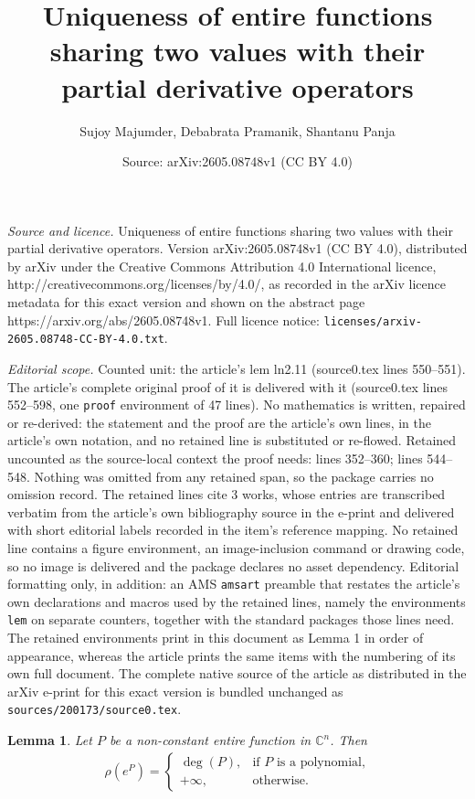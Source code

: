 \documentclass[10pt,a4paper]{amsart}
\title{\LARGE U\Large\MakeLowercase {niqueness of entire functions sharing two values with their partial derivative operators}}
\author{Sujoy Majumder, Debabrata Pramanik, Shantanu Panja}
\date{Source: arXiv:2605.08748v1 (CC BY 4.0)}
\newtheorem{lem}{Lemma}
\begin{document}
\maketitle

\noindent\emph{Source and licence.} \LARGE U\Large\MakeLowercase {niqueness of entire functions sharing two values with their partial derivative operators}. Version arXiv:2605.08748v1 (CC BY 4.0), distributed by arXiv under the Creative Commons Attribution 4.0 International licence, http://creativecommons.org/licenses/by/4.0/, as recorded in the arXiv licence metadata for this exact version and shown on the abstract page https://arxiv.org/abs/2605.08748v1. Full licence notice: \texttt{licenses/arxiv-2605.08748-CC-BY-4.0.txt}.\par\smallskip

\noindent\textit{Editorial scope.} Counted unit: the article's lem ln2.11 (source0.tex lines 550--551). The article's complete original proof of it is delivered with it (source0.tex lines 552--598, one \texttt{proof} environment of 47 lines). No mathematics is written, repaired or re-derived: the statement and the proof are the article's own lines, in the article's own notation, and no retained line is substituted or re-flowed.  Retained uncounted as the source-local context the proof needs: lines 352--360; lines 544--548.  Nothing was omitted from any retained span, so the package carries no omission record.  The retained lines cite 3 works, whose entries are transcribed verbatim from the article's own bibliography source in the e-print and delivered with short editorial labels recorded in the item's reference mapping.  No retained line contains a figure environment, an image-inclusion command or drawing code, so no image is delivered and the package declares no asset dependency.  Editorial formatting only, in addition: an AMS \texttt{amsart} preamble that restates the article's own declarations and macros used by the retained lines, namely the environments \texttt{lem} on separate counters, together with the standard packages those lines need.  The retained environments print in this document as Lemma 1 in order of appearance, whereas the article prints the same items with the numbering of its own full document.  The complete native source of the article as distributed in the arXiv e-print for this exact version is bundled unchanged as \texttt{sources/200173/source0.tex}.
\begin{lem}\label{ln2.6}\cite[Lemma 3.59]{Hu-Li-Yang-2003} Let $P$ be a non-constant entire function in $\mathbb{C}^n$. Then 
\begin{align*}
\rho(e^P)=
\begin{cases}
\deg(P), & \text{if $P$ is a polynomial,}\\
+\infty, & \text{otherwise.}
\end{cases}
\end{align*}
\end{lem}
\end{document}
